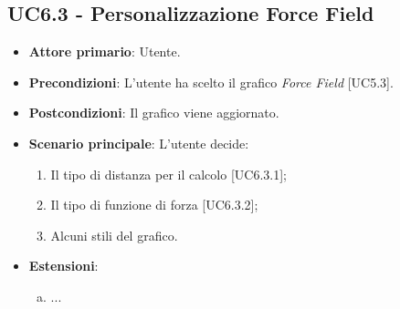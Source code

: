 \subsection{UC6.3 - Personalizzazione Force Field}
\begin{itemize}
	\item \textbf{Attore primario}: Utente.
	
	\item \textbf{Precondizioni}: L'utente ha scelto il grafico \textit{Force Field} [UC5.3].
	
	\item \textbf{Postcondizioni}: Il grafico viene aggiornato.
	
	\item \textbf{Scenario principale}: L'utente decide:
	
\begin{enumerate}
\item Il tipo di distanza per il calcolo [UC6.3.1];
\item Il tipo di funzione di forza [UC6.3.2];
\item Alcuni stili del grafico.
\end{enumerate}	
		
	\item \textbf{Estensioni}:
	\begin{enumerate}[(a)]
		\item ...
	\end{enumerate}
\end{itemize}

